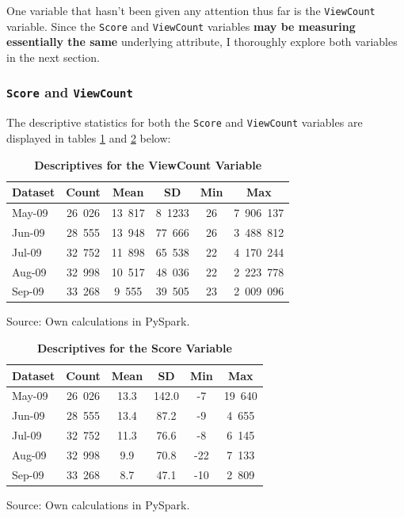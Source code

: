 \documentclass[11pt,preprint, authoryear]{article}
\numberwithin{equation}{section}
\begin{document}
One variable that hasn't been given any attention thus far is the
\texttt{ViewCount} variable. Since the \texttt{Score} and
\texttt{ViewCount} variables \textbf{may be measuring essentially the
same} underlying attribute, I thoroughly explore both variables in the
next section.

\subsubsection{\texorpdfstring{\texttt{Score} and
\texttt{ViewCount}}{Score and ViewCount}}\label{score-and-viewcount}

The descriptive statistics for both the \texttt{Score} and
\texttt{ViewCount} variables are displayed in tables
\ref{tab:viewc_desc} and \ref{tab:score_desc} below:

\footnotesize

\begin{longtable} {@{} lccccc @{}}
\caption{\textbf{Descriptives for the ViewCount Variable}}
\label{tab:viewc_desc}\\ 
\toprule
\textbf{Dataset} & \textbf{Count} & \textbf{Mean} & \textbf{SD} & \textbf{Min} & \textbf{Max} \\ 
\midrule
May-09 &  26\ 026 &  13\ 817 &  8\ 1233  &   26 &  7\ 906\ 137 \\
Jun-09 &  28\ 555 &  13\ 948  &  77\ 666  &   26 &  3\ 488\ 812 \\
Jul-09 &  32\ 752 &  11\ 898  &  65\ 538  &   22 &  4\ 170\ 244 \\
Aug-09 &  32\ 998 &  10\ 517  &  48\ 036  &   22 &  2\ 223\ 778 \\
Sep-09 &  33\ 268 &   9\ 555  &  39\ 505  &   23 &  2\ 009\ 096 \\
\bottomrule
\end{longtable}\begin{center} Source: Own calculations in PySpark.\end{center}

\normalsize

\footnotesize

\begin{longtable} {@{} lccccc @{}}
\caption{\textbf{Descriptives for the Score Variable}}
\label{tab:score_desc}\\ 
\toprule
\textbf{Dataset} & \textbf{Count} & \textbf{Mean} & \textbf{SD} & \textbf{Min} & \textbf{Max} \\ 
\midrule
May-09 &  26\ 026 &  13.3 &   142.0 &   -7 &  19\ 640 \\
Jun-09 &  28\ 555 &  13.4 &    87.2 &   -9 &   4\ 655 \\
Jul-09 &  32\ 752 &  11.3 &    76.6 &   -8 &   6\ 145 \\
Aug-09 &  32\ 998 &   9.9 &    70.8 &  -22 &   7\ 133 \\
Sep-09 &  33\ 268 &   8.7 &    47.1 &  -10 &   2\ 809 \\
\bottomrule
\end{longtable}\begin{center} Source: Own calculations in PySpark.\end{center}
\end{document}

